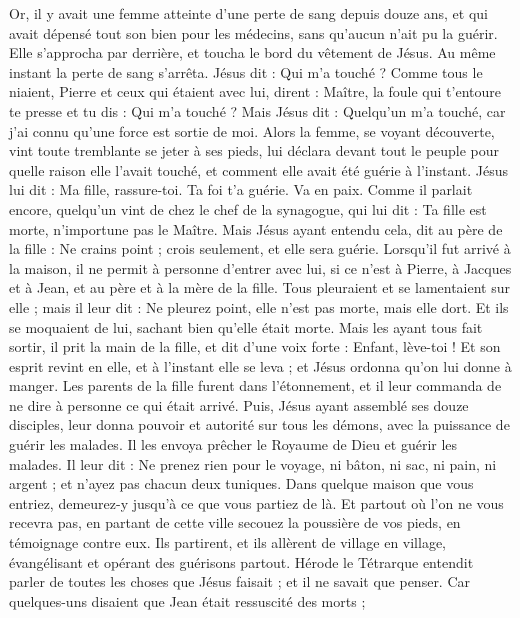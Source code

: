 \begin{multicols}{2}
Or, il y avait une femme atteinte d'une perte de sang depuis douze ans, et qui avait dépensé tout son bien pour les médecins, sans qu'aucun n'ait pu la guérir.
Elle s'approcha par derrière, et toucha le bord du vêtement de Jésus. Au même instant la perte de sang s'arrêta.
Jésus dit : Qui m'a touché ? Comme tous le niaient, Pierre et ceux qui étaient avec lui, dirent : Maître, la foule qui t'entoure te presse et tu dis : Qui m'a touché ?
Mais Jésus dit : Quelqu'un m'a touché, car j'ai connu qu'une force est sortie de moi.
Alors la femme, se voyant découverte, vint toute tremblante se jeter à ses pieds, lui déclara devant tout le peuple pour quelle raison elle l'avait touché, et comment elle avait été guérie à l'instant.
Jésus lui dit : Ma fille, rassure-toi. Ta foi t'a guérie. Va en paix.
Comme il parlait encore, quelqu'un vint de chez le chef de la synagogue, qui lui dit : Ta fille est morte, n'importune pas le Maître.
Mais Jésus ayant entendu cela, dit au père de la fille : Ne crains point ; crois seulement, et elle sera guérie.
Lorsqu'il fut arrivé à la maison, il ne permit à personne d'entrer avec lui, si ce n'est à Pierre, à Jacques et à Jean, et au père et à la mère de la fille.
Tous pleuraient et se lamentaient sur elle ; mais il leur dit : Ne pleurez point, elle n'est pas morte, mais elle dort.
Et ils se moquaient de lui, sachant bien qu'elle était morte.
Mais les ayant tous fait sortir, il prit la main de la fille, et dit d'une voix forte : Enfant, lève-toi !
Et son esprit revint en elle, et à l'instant elle se leva ; et Jésus ordonna qu'on lui donne à manger.
Les parents de la fille furent dans l'étonnement, et il leur commanda de ne dire à personne ce qui était arrivé.
\VerseOne{}Puis, Jésus ayant assemblé ses douze disciples, leur donna pouvoir et autorité sur tous les démons, avec la puissance de guérir les malades.
Il les envoya prêcher le Royaume de Dieu et guérir les malades.
Il leur dit : Ne prenez rien pour le voyage, ni bâton, ni sac, ni pain, ni argent ; et n'ayez pas chacun deux tuniques.
Dans quelque maison que vous entriez, demeurez-y jusqu'à ce que vous partiez de là.
Et partout où l'on ne vous recevra pas, en partant de cette ville secouez la poussière de vos pieds, en témoignage contre eux.
Ils partirent, et ils allèrent de village en village, évangélisant et opérant des guérisons partout.
Hérode le Tétrarque entendit parler de toutes les choses que Jésus faisait ; et il ne savait que penser. Car quelques-uns disaient que Jean était ressuscité des morts ;

\end{multicols}
